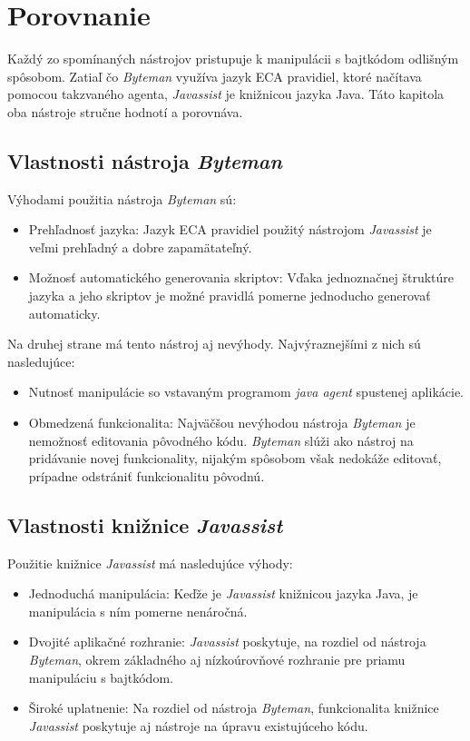\documentclass[11pt,final,oneside]{fithesis}
\begin{document}
\chapter{Porovnanie}

Každý zo spomínaných nástrojov pristupuje k manipulácii s bajtkódom odlišným 
spôsobom. Zatiaľ čo \textit{Byteman} využíva jazyk ECA pravidiel, ktoré 
načítava pomocou takzvaného agenta, \textit{Javassist} je knižnicou jazyka 
Java. Táto kapitola oba nástroje stručne hodnotí a porovnáva.

\section{Vlastnosti nástroja \textit{Byteman}}
Výhodami použitia nástroja \textit{Byteman} sú:

\begin{itemize}
\item Prehľadnosť jazyka: Jazyk ECA pravidiel použitý nástrojom 
\textit{Javassist} je veľmi prehľadný a dobre zapamätateľný. 
\item Možnosť automatického generovania skriptov: Vďaka jednoznačnej štruktúre 
jazyka a jeho skriptov je možné pravidlá pomerne jednoducho generovať 
automaticky.
\end{itemize}

Na druhej strane má tento nástroj aj nevýhody. Najvýraznejšími z nich sú nasledujúce:

\begin{itemize}
\item Nutnosť manipulácie so vstavaným programom \textit{java agent} spustenej
aplikácie.
\item Obmedzená funkcionalita: Najväčšou nevýhodou nástroja 
\textit{Byteman} je nemožnosť editovania pôvodného kódu. \textit{Byteman} slúži
ako nástroj na pridávanie novej funkcionality, nijakým spôsobom však nedokáže 
editovať, prípadne odstrániť funkcionalitu pôvodnú. 
\end{itemize}

\section{Vlastnosti knižnice \textit{Javassist}}
Použitie knižnice \textit{Javassist} má nasledujúce 
výhody:

\begin{itemize}
\item Jednoduchá manipulácia: Keďže je \textit{Javassist} knižnicou jazyka 
Java, je manipulácia s ním pomerne nenáročná.
\item Dvojité aplikačné rozhranie: \textit{Javassist} poskytuje, na rozdiel od 
nástroja \textit{Byteman}, okrem základného aj nízkoúrovňové rozhranie pre 
priamu manipuláciu s bajtkódom.
\item Široké uplatnenie: Na rozdiel od nástroja \textit{Byteman}, funkcionalita
knižnice \textit{Javassist} poskytuje aj nástroje na úpravu existujúceho kódu.
\end{itemize}
\end{document}
